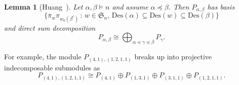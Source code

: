 \documentclass[10pt]{amsart}
\newtheorem{lemma}[theorem]{Lemma}
\theoremstyle{definition}
\newcommand{\Des}{{\mathrm {Des}}}
\newcommand{\symm}{{\mathfrak{S}}}
\newcommand{\FF}{{\mathbb{F}}}
\newcommand{\pib}{\overline{\pi}}
\newcommand{\edit}[1]{{\color{red}{\bf {#1}}}}
\begin{document}
\begin{lemma}[{Huang~\cite[Thm. 3.2]{HuangTab}}]
\label{alpha-beta-structure}
Let $\alpha, \beta \models n$ and assume $\alpha \preceq \beta$.  
Then $P_{\alpha,\beta}$ has basis
\begin{equation}
\label{ab-basis}
\{ \pib_w \pi_{w_0(\beta^c)} \,:\, w \in \symm_n, \, \Des(\alpha) \subseteq \Des(w) \subseteq \Des(\beta) \}
\end{equation}
and direct sum decomposition
\begin{equation}
P_{\alpha,\beta} \cong \bigoplus_{\alpha\preceq \gamma\preceq \beta} P_{\gamma}.
\end{equation}
\end{lemma}

{For example, the module $P_{(4,1),(1,2,1,1)}$ breaks up into projective indecomposable submodules as
\[P_{(4,1),(1,2,1,1)} \cong P_{(4,1)} \oplus P_{(1,3,1)} \oplus P_{(3,1,1)} \oplus P_{(1,2,1,1)}.\]}

\end{document}
